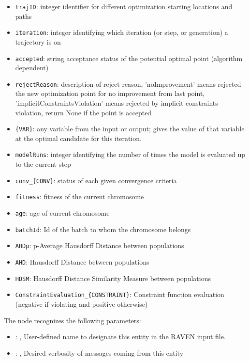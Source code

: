         \begin{itemize}
          \item \texttt{trajID}: integer identifier for different optimization starting locations and paths
             \item \texttt{iteration}: integer identifying which iteration (or step, or generation) a trajectory is on
             \item \texttt{accepted}: string acceptance status of the potential optimal point (algorithm dependent)
             \item \texttt{rejectReason}: description of reject reason, 'noImprovement' means rejected the new optimization point for no improvement from last point, 'implicitConstraintsViolation' means rejected by implicit constraints violation, return None if the point is accepted
             \item \texttt{\{VAR\}}: any variable from the  input or output; gives the value of that variable at the optimal candidate for this iteration.
             \item \texttt{modelRuns}: integer identifying the number of times the model is evaluated up to the current step
             \item \texttt{conv\_\{CONV\}}: status of each given convergence criteria
             \item \texttt{fitness}: fitness of the current chromosome
             \item \texttt{age}: age of current chromosome
             \item \texttt{batchId}: Id of the batch to whom the chromosome belongs
             \item \texttt{AHDp}: p-Average Hausdorff Distance between populations
             \item \texttt{AHD}: Hausdorff Distance between populations
             \item \texttt{HDSM}: Hausdorff Distance Similarity Measure between populations
             \item \texttt{ConstraintEvaluation\_\{CONSTRAINT\}}: Constraint function evaluation (negative if violating and positive otherwise)

         \end{itemize}

  The  node recognizes the following parameters:
    \begin{itemize}
      \item {}: ,
        User-defined name to designate this entity in the RAVEN input file.
      \item {}: ,
        Desired verbosity of messages coming from this entity
  \end{itemize}

